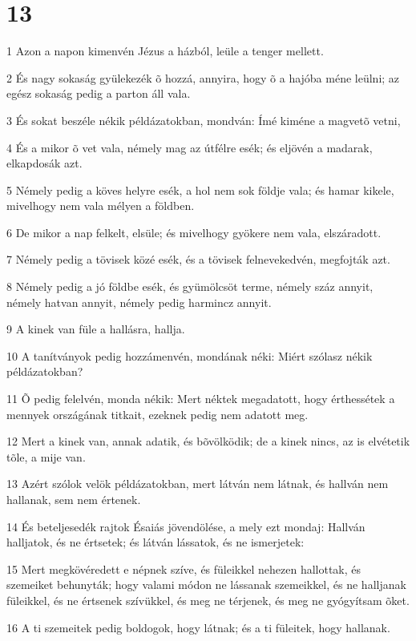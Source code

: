 \chapter{13}

\par 1 Azon a napon kimenvén Jézus a házból, leüle a tenger mellett.
\par 2 És nagy sokaság gyülekezék õ hozzá, annyira, hogy õ a hajóba méne leülni; az egész sokaság pedig a parton áll vala.
\par 3 És sokat beszéle nékik példázatokban, mondván: Ímé kiméne a magvetõ vetni,
\par 4 És a mikor õ vet vala, némely mag az útfélre esék; és eljövén a madarak, elkapdosák azt.
\par 5 Némely pedig a köves helyre esék, a hol nem sok földje vala; és hamar kikele, mivelhogy nem vala mélyen a földben.
\par 6 De mikor a nap felkelt, elsüle; és mivelhogy gyökere nem vala, elszáradott.
\par 7 Némely pedig a tövisek közé esék, és a tövisek felnevekedvén, megfojták azt.
\par 8 Némely pedig a jó földbe esék, és gyümölcsöt terme, némely száz annyit, némely hatvan annyit, némely pedig harmincz annyit.
\par 9 A kinek van füle a hallásra, hallja.
\par 10 A tanítványok pedig hozzámenvén, mondának néki: Miért szólasz nékik példázatokban?
\par 11 Õ pedig felelvén, monda nékik: Mert néktek megadatott, hogy érthessétek a mennyek országának titkait, ezeknek pedig nem adatott meg.
\par 12 Mert a kinek van, annak adatik, és bõvölködik; de a kinek nincs, az is elvétetik tõle, a mije van.
\par 13 Azért szólok velök példázatokban, mert látván nem látnak, és hallván nem hallanak, sem nem értenek.
\par 14 És beteljesedék rajtok Ésaiás jövendölése, a mely ezt mondaj: Hallván halljatok, és ne értsetek; és látván lássatok, és ne ismerjetek:
\par 15 Mert megkövéredett e népnek szíve, és füleikkel nehezen hallottak, és szemeiket behunyták; hogy valami módon ne lássanak szemeikkel, és ne halljanak füleikkel, és ne értsenek szívükkel, és meg ne térjenek, és meg ne gyógyítsam õket.
\par 16 A ti szemeitek pedig boldogok, hogy látnak; és a ti füleitek, hogy hallanak.
